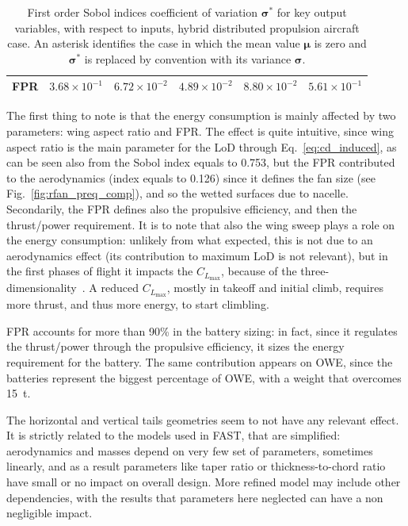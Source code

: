 \begin{table}[!h]
\begin{tabular}{l c c c c c}
		FPR & $3.68\times10^{-1}$ & $6.72\times10^{-2}$ & $4.89\times10^{-2}$ & $8.80\times10^{-2}$ & $5.61\times10^{-1}$ \\
		\hline
	\end{tabular}
	\caption{First order Sobol indices coefficient of variation $\mathbf{\sigma^*}$ for key output variables, with respect to inputs, hybrid distributed propulsion aircraft case.
		An asterisk identifies the case in which the mean value $\mathbf{\mu}$ is zero and $\mathbf{\sigma^*}$ is replaced by convention with its variance $\mathbf{\sigma}$.}
	\label{tab:hybrid_dep_sens_an_geom_cv}
\end{table}

The first thing to note is that the energy consumption is mainly affected by two parameters: wing aspect ratio and FPR. 
The effect is quite intuitive, since wing aspect ratio is the main parameter for the LoD through Eq.~\eqref{eq:cd_induced}, as can be seen also from the Sobol index equals to 0.753, but the FPR contributed to the aerodynamics (index equals to 0.126) since it defines the fan size (see Fig.~\ref{fig:rfan_preq_comp}), and so the wetted surfaces due to nacelle. 
Secondarily, the FPR defines also the propulsive efficiency, and then the thrust/power requirement. 
It is to note that also the wing sweep plays a role on the energy consumption: unlikely from what expected, this is not due to an aerodynamics effect (its contribution to maximum LoD is not relevant), but in the first phases of flight it impacts the $C_{L_{\max}}$, because of the three-dimensionality~\cite{bib:abbott}. 
A reduced $C_{L_{\max}}$, mostly in takeoff and initial climb, requires more thrust, and thus more energy, to start climbling.

FPR accounts for more than 90\% in the battery sizing: in fact, since it regulates the thrust/power through the propulsive efficiency, it sizes the energy requirement for the battery. 
The same contribution appears on OWE, since the batteries represent the biggest percentage of OWE, with a weight that overcomes 15~\si{\tonne}.

The horizontal and vertical tails geometries seem to not have any relevant effect. 
It is strictly related to the models used in FAST, that are simplified: aerodynamics and masses depend on very few set of parameters, sometimes linearly, and as a result parameters like taper ratio or thickness-to-chord ratio have small or no impact on overall design. 
More refined model may include other dependencies, with the results that parameters here neglected can have a non negligible impact.

